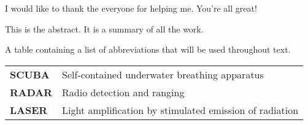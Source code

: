 \documentclass[a4paper,oneside,11pt]{book}
\begin{document}
\AssistantSupervisor{} %

\MakeTitle %


\begin{Acknowledgements}{}
			I would like to thank the everyone for helping me. You're all great!
\end{Acknowledgements}


\begin{Abstract}{}
			This is the abstract. It is a summary of all the work.
\end{Abstract}


\MakeTOCandLOFandLOT %


\begin{TableOfAbbrev}
			A table containing a list of abbreviations that will be used throughout text.
			\begin{table}[!htpb!]%
			\begin{tabular}{ll}
			\textbf{SCUBA} & Self-contained underwater breathing apparatus\\
			\textbf{RADAR} & Radio detection and ranging\\
			\textbf{LASER} & Light amplification by stimulated emission of radiation\\
			\end{tabular}
			\end{table}
\end{TableOfAbbrev}
\end{document}
